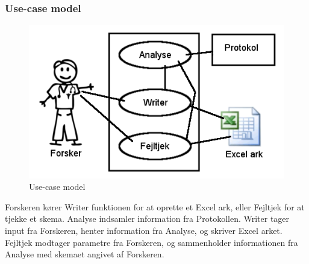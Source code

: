 \documentclass[11pt]{article}
\begin{document}
\subsubsection{Use-case model}
\begin{figure}[H]
\includegraphics[scale=0.5]{usecase.png}
\caption{Use-case model}
\end{figure}
Forskeren kører Writer funktionen for at oprette et Excel ark,
eller Fejltjek for at tjekke et skema.
Analyse indsamler information fra Protokollen.
Writer tager input fra Forskeren, henter information fra Analyse, og skriver Excel arket. Fejltjek modtager parametre fra Forskeren, og sammenholder informationen fra Analyse med skemaet angivet af Forskeren.
\end{document}
